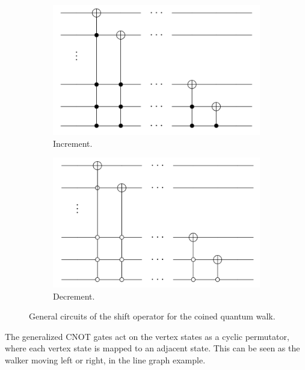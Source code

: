 \documentclass[../../dissertation.tex]{subfiles}
\begin{document}
\begin{figure}[!h]
  \centering
  \begin{subfigure}[t]{.4\textwidth}
    \centering
    \includegraphics[width=\linewidth]{img/QCircuit/CoinedQuantumWalk/DouglasWangIncrement.png}
    \caption{Increment.}
  \end{subfigure}
  \begin{subfigure}[t]{.4\textwidth}
    \centering
    \includegraphics[width=\linewidth]{img/QCircuit/CoinedQuantumWalk/DouglasWangDecrement.png}
    \caption{Decrement.}
  \end{subfigure}
  \caption{General circuits of the shift operator for the coined quantum walk.}
  \label{fig:douglasWangShift}
\end{figure}
The generalized CNOT gates act on the vertex states as a cyclic permutator, where
each vertex state is mapped to an adjacent state. This can be seen as the walker moving
left or right, in the line graph example.
\end{document}
